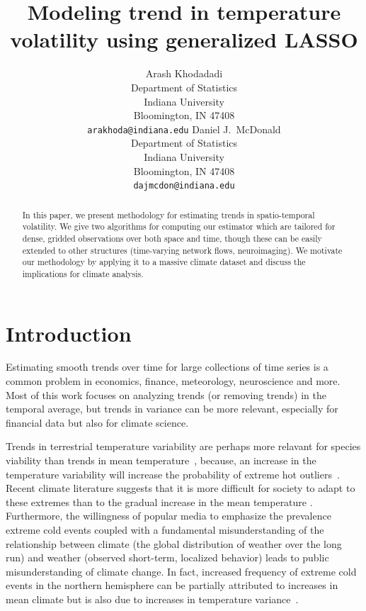 \documentclass{article}
\title{Modeling trend in temperature volatility using generalized LASSO}
\author{Arash Khodadadi\\
 Department of Statistics\\
 Indiana University\\
 Bloomington, IN 47408 \\
 \texttt{arakhoda@indiana.edu}
\And
  Daniel J.\ McDonald \\
 Department of Statistics\\
 Indiana University\\
 Bloomington, IN 47408 \\
 \texttt{dajmcdon@indiana.edu}}
\begin{document}
 


\maketitle


\begin{abstract}
In this paper, we present methodology for estimating trends in
spatio-temporal volatility. We give two algorithms for computing our
estimator which are tailored for dense, gridded observations over both
space and time, though these can be easily extended to other
structures (time-varying network flows, neuroimaging). We motivate our
methodology by applying it to a massive climate dataset and
discuss the implications for climate analysis.
\end{abstract}



\section{Introduction}

Estimating smooth trends over time for large collections of time
series is a common problem in economics, finance, meteorology,
neuroscience and more. Most of this work focuses on analyzing trends
(or removing trends) in the temporal average, but trends in variance
can be more relevant, especially for financial data but also for
climate science.

Trends in terrestrial temperature variability are perhaps more relavant for species
viability than trends in mean
temperature~\citep{huntingford_no_2013},
because, an increase in the
temperature variability will increase the probability of extreme hot
outliers~\citep{VasseurDeLong2014}. Recent climate literature
suggests that it is more difficult for society to adapt to these
extremes than to the gradual increase in the mean temperature
\citep{hansen_perception_2012,huntingford_no_2013}. Furthermore, the willingness of popular media to
emphasize the prevalence extreme cold events coupled with a
fundamental misunderstanding of the relationship between climate (the global
distribution of weather over the long run) and weather (observed
short-term, localized behavior) leads to public misunderstanding of climate
change. In fact, increased frequency of extreme cold events in the
northern hemisphere can be partially attributed to increases in
mean climate but is also due to increases in temperature
variance~\citep{Screen2014,FischerBeyerle2013,TrenberthZhang2014}. 
\end{document}
